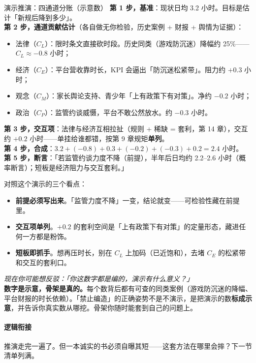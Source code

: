 \documentclass[../../main2.tex]{subfiles}
\begin{document}
\begin{mathbox}{演示推演：四通道分账（示意数）}
	\textbf{第 1 步，基准}：现状日均 3.2 小时。目标是估计「新规后降到多少」。\\
	\textbf{第 2 步，通道贡献估计}（各自做无你检验，历史案例 + 财报 + 舆情为证据）：
	\begin{itemize}
		\item 法律（$C_L$）：限时条文直接砍时段。历史同类（游戏防沉迷）降幅约 25\%——$C_L \approx -0.8$ 小时；
		\item 经济（$C_E$）：平台营收靠时长，KPI 会逼出「防沉迷松紧带」。阻力约 $+0.3$ 小时；
		\item 观念（$C_M$）：家长舆论支持、青少年「上有政策下有对策」。净约 $-0.2$ 小时；
		\item 政治（$C_P$）：监管约谈威慑，平台不敢公然放水。约 $-0.3$ 小时。
	\end{itemize}
	\textbf{第 3 步，交互项}：法律与经济互相拉扯（规则 + 稀缺 = 套利，第 14 章），交互约 $+0.2$ 小时——单挂给谁都错，按第 9 章规矩\textbf{单列}。\\
	\textbf{第 4 步，合成}：$3.2 + (-0.8) + 0.3 + (-0.2) + (-0.3) + 0.2 = 2.4$ 小时。\\
	\textbf{第 5 步，断言}：「若监管约谈力度不降（前提），半年后日均约 2.2–2.6 小时（概率断言）；短板是经济阻力与交互套利。」
\end{mathbox}

对照这个演示的三个看点：

\begin{itemize}
	\item \textbf{前提必须写出来}。「监管力度不降」一变，结论就变——可检验性藏在前提里。
	\item \textbf{交互项单列}。$+0.2$ 的套利空间是「上有政策下有对策」的定量形态，藏进任何一方都是粉饰。
	\item \textbf{短板即抓手}。想再压时长，别在 $C_L$ 上加码（已近饱和），去堵 $C_E$ 的松紧带和交互的套利口。
\end{itemize}

\begin{questionbox}
	\textit{现在你可能想反驳：「你这数字都是编的，演示有什么意义？」}\\
	\textbf{数字是示意，骨架是真的。}每个数背后都有可查的同类案例（游戏防沉迷的降幅、平台财报的时长依赖）。「禁止编造」的正确姿势不是不演示，是把演示的数\textbf{标成示意}，并告诉你真实数从哪挖。骨架你随时能套到自己的问题上。
\end{questionbox}

\paragraph*{逻辑衔接}
	推演走完一遍了。但一本诚实的书必须自曝其短——这套方法在哪里会摔？下一节清单列满。
\end{document}
